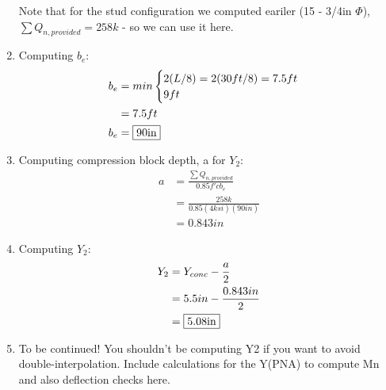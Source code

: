 \documentclass{report} %
\begin{document}
\begin{enumerate}
        Note that for the stud configuration we computed eariler (15 - 3/4in $\Phi$), $\sum Q_{n,provided} = 258k$ - so we can use it here.
    \item Computing $b_e$: 
        \begin{equation*}
            \begin{aligned}
                b_e &= min
                \begin{cases}
                    2(L/8) = 2(30ft/8) = 7.5ft\\
                    9ft
                \end{cases} \\
                    &= 7.5 ft \\
                b_e &= \framebox{90in} 
            \end{aligned}
        \end{equation*}
    \item Computing compression block depth, a for $Y_2$:
        \begin{equation*}
            \begin{aligned}
                a &= \frac{\sum Q_{n,provided}}{0.85f'cb_e} \\
                    &= \frac{258k}{0.85(4ksi)(90in)} \\
                    &= 0.843in
            \end{aligned}
        \end{equation*}
    \item Computing $Y_2$:
        \begin{equation*}
            \begin{aligned}
                Y_2 &= Y_{conc} - \frac{a}{2} \\
                    &= 5.5in - \frac{0.843in}{2} \\
                    &= \framebox{5.08in}
            \end{aligned}
        \end{equation*}
    \item To be continued! You shouldn't be computing Y2 if you want to avoid double-interpolation. Include calculations for the Y(PNA) to compute Mn and also deflection checks here.
    \end{enumerate}
\end{document}
